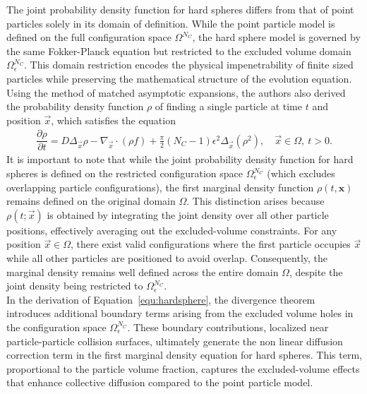 The joint probability density function for hard spheres differs from that of point particles solely in its domain of definition. 
While the point particle model is defined on the full configuration space $\Omega^{N_C}$, the hard sphere model is governed by the same Fokker-Planck equation but restricted to the excluded volume domain $\Omega_{\epsilon}^{N_C}$. 
This domain restriction encodes the physical impenetrability of finite sized particles while preserving the mathematical structure of the evolution equation. \\

Using the method of matched asymptotic expansions, the authors also derived the probability density function $\rho$ of finding a single particle at time $t$ and position $\vec{x}$, which satisfies the equation
\begin{align}
	\dfrac{\partial \rho}{\partial t} = D \Delta_{\vec{x}} \rho - \nabla_{\vec{x}} \cdot (\rho f) + \frac{\pi}{2} (N_C - 1) \epsilon^2 \Delta_{\vec{x}} (\rho^2), \quad \vec{x} \in \Omega, \: t>0 .
	\label{equ:hardsphere}
\end{align}
It is important to note that while the joint probability density function for hard spheres is defined on the restricted configuration space $\Omega_{\epsilon}^{N_C}$ (which excludes overlapping particle configurations), the first marginal density function $\rho(t, \mathbf{x})$ remains defined on the original domain $\Omega$. 
This distinction arises because $\rho(t; \vec{x})$ is obtained by integrating the joint density over all other particle positions, effectively averaging out the excluded-volume constraints. 
For any position $\vec{x} \in \Omega$, there exist valid configurations where the first particle occupies $\vec{x}$ while all other particles are positioned to avoid overlap. 
Consequently, the marginal density remains well defined across the entire domain $\Omega$, despite the joint density being restricted to $\Omega_{\epsilon}^{N_C}$. \\
In the derivation of Equation~\eqref{equ:hardsphere}, the divergence theorem introduces additional boundary terms arising from the excluded volume holes in the configuration space $\Omega_{\epsilon}^{N_C}$. 
These boundary contributions, localized near particle-particle collision surfaces, ultimately generate the non linear diffusion correction term in the first marginal density equation for hard spheres. 
This term, proportional to the particle volume fraction, captures the excluded-volume effects that enhance collective diffusion compared to the point particle model. \\
